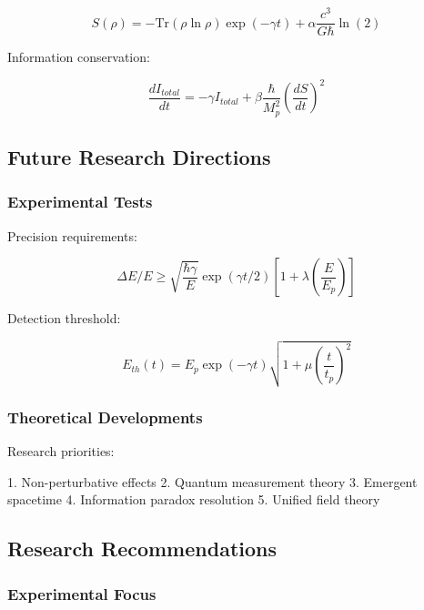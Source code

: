 \documentclass[12pt]{article}
\theoremstyle{plain}
\theoremstyle{definition}
\theoremstyle{remark}
\begin{document}
\begin{equation}
S(\rho) = -\text{Tr}(\rho\ln\rho)\exp(-\gamma t) + \alpha\frac{c^3}{G\hbar}\ln(2)
\end{equation}

Information conservation:

\begin{equation}
\frac{dI_{total}}{dt} = -\gamma I_{total} + \beta\frac{\hbar}{M_p^2}\left(\frac{dS}{dt}\right)^2
\end{equation}

\subsection{Future Research Directions}

\subsubsection{Experimental Tests}

Precision requirements:

\begin{equation}
\Delta E/E \geq \sqrt{\frac{\hbar\gamma}{E}}\exp(\gamma t/2)\left[1 + \lambda\left(\frac{E}{E_p}\right)\right]
\end{equation}

Detection threshold:

\begin{equation}
E_{th}(t) = E_p\exp(-\gamma t)\sqrt{1 + \mu\left(\frac{t}{t_p}\right)^2}
\end{equation}

\subsubsection{Theoretical Developments}

Research priorities:

1. Non-perturbative effects
2. Quantum measurement theory
3. Emergent spacetime
4. Information paradox resolution
5. Unified field theory

\subsection{Research Recommendations}

\subsubsection{Experimental Focus}
\end{document}
